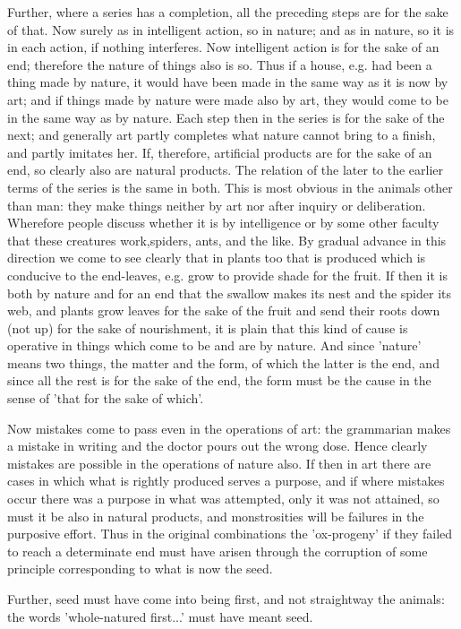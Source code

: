 Further, where a series has a completion, all the preceding steps
are for the sake of that. Now surely as in intelligent action, so
in nature; and as in nature, so it is in each action, if nothing interferes.
Now intelligent action is for the sake of an end; therefore the nature
of things also is so. Thus if a house, e.g. had been a thing made
by nature, it would have been made in the same way as it is now by
art; and if things made by nature were made also by art, they would
come to be in the same way as by nature. Each step then in the series
is for the sake of the next; and generally art partly completes what
nature cannot bring to a finish, and partly imitates her. If, therefore,
artificial products are for the sake of an end, so clearly also are
natural products. The relation of the later to the earlier terms of
the series is the same in both. This is most obvious in the animals
other than man: they make things neither by art nor after inquiry
or deliberation. Wherefore people discuss whether it is by intelligence
or by some other faculty that these creatures work,spiders, ants,
and the like. By gradual advance in this direction we come to see
clearly that in plants too that is produced which is conducive to
the end-leaves, e.g. grow to provide shade for the fruit. If then
it is both by nature and for an end that the swallow makes its nest
and the spider its web, and plants grow leaves for the sake of the
fruit and send their roots down (not up) for the sake of nourishment,
it is plain that this kind of cause is operative in things which come
to be and are by nature. And since 'nature' means two things, the
matter and the form, of which the latter is the end, and since all
the rest is for the sake of the end, the form must be the cause in
the sense of 'that for the sake of which'. 

Now mistakes come to pass even in the operations of art: the grammarian
makes a mistake in writing and the doctor pours out the wrong dose.
Hence clearly mistakes are possible in the operations of nature also.
If then in art there are cases in which what is rightly produced serves
a purpose, and if where mistakes occur there was a purpose in what
was attempted, only it was not attained, so must it be also in natural
products, and monstrosities will be failures in the purposive effort.
Thus in the original combinations the 'ox-progeny' if they failed
to reach a determinate end must have arisen through the corruption
of some principle corresponding to what is now the seed.

Further, seed must have come into being first, and not straightway
the animals: the words 'whole-natured first...' must have meant seed.

